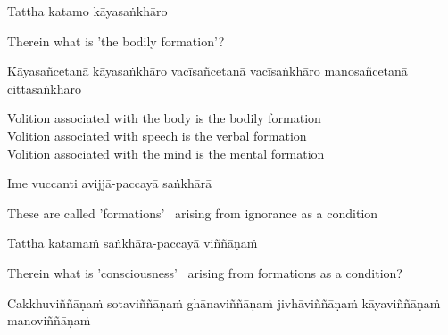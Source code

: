 Tattha katamo kāyasaṅkhāro

\begin{english}
  Therein what is 'the bodily formation'?
\end{english}

\begin{pali-hang}
  Kāyasañcetanā kāyasaṅkhāro vacīsañcetanā vacīsaṅkhāro manosañcetanā cittasaṅkhāro\makeatletter\hyperlink{endnote78-appendix}\makeatother
\end{pali-hang}

\begin{english-verses}
  Volition associated with the body is the bodily formation\\
  Volition associated with speech is the verbal formation\\
  Volition associated with the mind is the mental\makeatletter\hyperlink{endnote79-appendix}\makeatother
  formation
\end{english-verses}

Ime vuccanti avijjā-paccayā saṅkhārā

\begin{english}
  These are called 'formations' \breathmark\ arising from ignorance as a condition
\end{english}

Tattha katamaṁ saṅkhāra-paccayā viññāṇaṁ

\begin{english-hang}
  Therein what is 'consciousness' \breathmark\ arising from formations as a condition?
\end{english-hang}

\begin{pali-hang}
  Cakkhuviññāṇaṁ sotaviññāṇaṁ ghānaviññāṇaṁ jivhāviññāṇaṁ kāyaviññāṇaṁ manoviññāṇaṁ
\end{pali-hang}

